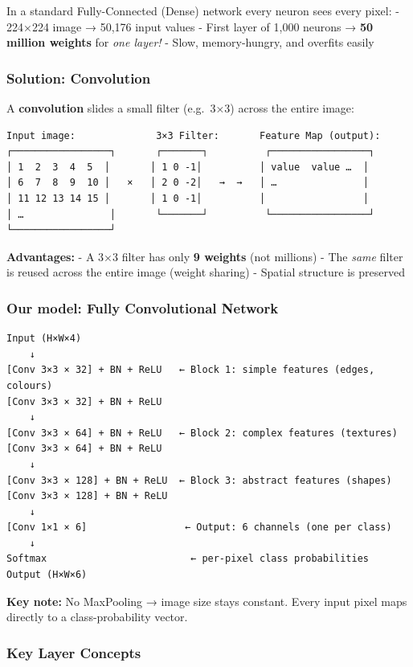 \documentclass[11pt]{article}
\begin{document}
In a standard Fully-Connected (Dense) network every neuron sees every
pixel: - 224×224 image → 50,176 input values - First layer of 1,000
neurons → \textbf{50 million weights} for \emph{one layer!} - Slow,
memory-hungry, and overfits easily

\subsubsection{Solution: Convolution}\label{solution-convolution}

A \textbf{convolution} slides a small filter (e.g.~3×3) across the
entire image:

\begin{verbatim}
Input image:              3×3 Filter:       Feature Map (output):
┌─────────────────┐       ┌───────┐          ┌─────────────────┐
│ 1  2  3  4  5  │       │ 1 0 -1│          │ value  value …  │
│ 6  7  8  9  10 │   ×   │ 2 0 -2│   →  →   │ …               │
│ 11 12 13 14 15 │       │ 1 0 -1│          │                 │
│ …               │       └───────┘          └─────────────────┘
└─────────────────┘
\end{verbatim}

\textbf{Advantages:} - A 3×3 filter has only \textbf{9 weights} (not
millions) - The \emph{same} filter is reused across the entire image
(weight sharing) - Spatial structure is preserved

\subsubsection{Our model: Fully Convolutional
Network}\label{our-model-fully-convolutional-network}

\begin{verbatim}
Input (H×W×4)
    ↓
[Conv 3×3 × 32] + BN + ReLU   ← Block 1: simple features (edges, colours)
[Conv 3×3 × 32] + BN + ReLU
    ↓
[Conv 3×3 × 64] + BN + ReLU   ← Block 2: complex features (textures)
[Conv 3×3 × 64] + BN + ReLU
    ↓
[Conv 3×3 × 128] + BN + ReLU  ← Block 3: abstract features (shapes)
[Conv 3×3 × 128] + BN + ReLU
    ↓
[Conv 1×1 × 6]                 ← Output: 6 channels (one per class)
    ↓
Softmax                         ← per-pixel class probabilities
Output (H×W×6)
\end{verbatim}

\textbf{Key note:} No MaxPooling → image size stays constant. Every
input pixel maps directly to a class-probability vector.

    \subsubsection{Key Layer Concepts}\label{key-layer-concepts}
\end{document}
